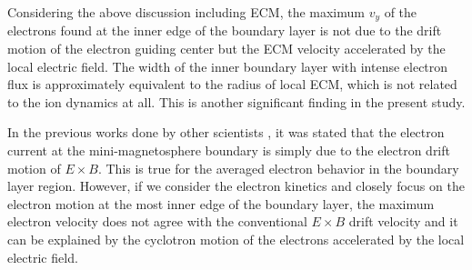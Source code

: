\documentclass[draft,jgrga]{agutex2015}
\begin{document}
\begin{article}

%
%

Considering the above discussion including ECM, 
the maximum $v_y$ of the electrons found at the inner edge of the 
boundary layer is not due to the drift motion of the electron guiding center
but the ECM velocity accelerated by the local electric field. 
The width of the inner boundary layer with intense electron flux 
is approximately equivalent to the radius of local ECM, 
which is not related to the ion dynamics at all.
This is another significant finding in the present study.

In the previous works done by other scientists \citep[e.g.][]{Deca2014},
it was stated that
the electron current at the mini-magnetosphere boundary is 
simply due to the electron drift motion of $E\times B$. 
This is true for the averaged electron behavior in the boundary layer region.
However, if we consider the electron kinetics and closely focus on the electron motion 
at the most inner edge of the boundary layer,
the maximum electron velocity does not agree with 
the conventional $E \times B$ drift velocity and it can be explained by the
cyclotron motion of the electrons accelerated by the local electric field. 

%
%
%
%


\end{article}
\end{document}
